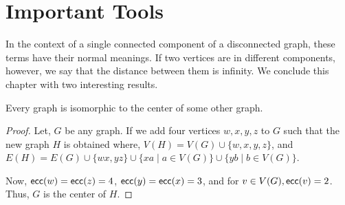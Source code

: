 \documentclass[../basic_graph_theory.tex]{subfiles}
\begin{document}
\section{Important Tools}
In the context of a single connected component of a disconnected graph, these terms have their normal meanings. If two vertices are in different components, however, we say that the distance between them is infinity. We conclude this chapter with two interesting results.

\begin{Thm}{}{}
    Every graph is isomorphic to the center of some other graph.
\end{Thm}
\begin{proof}
    Let, $G$ be any graph. If we add four vertices $w,x,y,z$ to $G$ such that the new graph $H$ is obtained where, $V(H) = V(G) \cup \{w,x,y,z\}$, and $E(H) = E(G) \cup \{wx,yz\} \cup \{xa \mid a \in V(G)\} \cup \{yb \mid b \in V(G)\}$.

    Now, $\operatorname{\mathsf{ecc}}(w)=\operatorname{\mathsf{ecc}}(z)=4$, $\operatorname{\mathsf{ecc}}(y)=\operatorname{\mathsf{ecc}}(x)=3$, and for $v \in V(G), \operatorname{\mathsf{ecc}}(v)=2$. Thus, $G$ is the center of $H$.
\end{proof}
\end{document}
